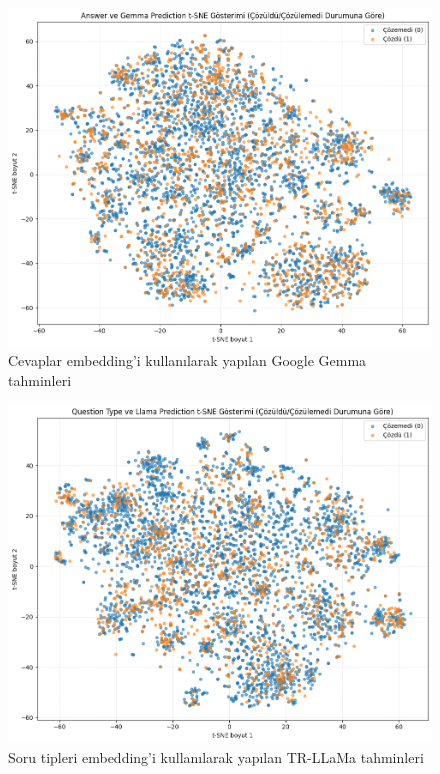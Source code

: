 \documentclass[conference]{IEEEtran}
\begin{document}
\begin{figure}[htbp]
\centering
\includegraphics[width=1\linewidth]{a-g.png}
\caption{Cevaplar embedding'i kullanılarak yapılan Google Gemma tahminleri}
\label{fig}
\end{figure}

\begin{figure}[htbp]
\centering
\includegraphics[width=1\linewidth]{qt-l.png}
\caption{Soru tipleri embedding'i kullanılarak yapılan TR-LLaMa tahminleri}
\label{fig}
\end{figure}
\end{document}
